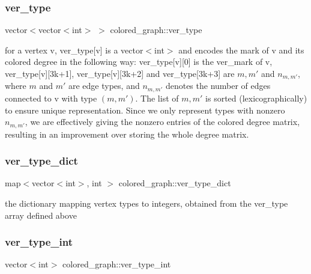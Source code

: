 \subsubsection{\texorpdfstring{ver\+\_\+type}{ver\_type}}
{\footnotesize\ttfamily vector$<$vector$<$int$>$ $>$ colored\+\_\+graph\+::ver\+\_\+type}



for a vertex v, ver\+\_\+type\mbox{[}v\mbox{]} is a vector$<$int$>$ and encodes the mark of v and its colored degree in the following way\+: ver\+\_\+type\mbox{[}v\mbox{]}\mbox{[}0\mbox{]} is the ver\+\_\+mark of v, ver\+\_\+type\mbox{[}v\mbox{]}\mbox{[}3k+1\mbox{]}, ver\+\_\+type\mbox{[}v\mbox{]}\mbox{[}3k+2\mbox{]} and ver\+\_\+type\mbox{[}3k+3\mbox{]} are $m, m'$ and $n_{m, m'}$, where $m$ and $m'$ are edge types, and $n_{m, m'}$ denotes the number of edges connected to v with type $(m, m')$. The list of $m, m'$ is sorted (lexicographically) to ensure unique representation. Since we only represent types with nonzero $n_{m, m'}$, we are effectively giving the nonzero entries of the colored degree matrix, resulting in an improvement over storing the whole degree matrix. 

\mbox{\label{classcolored__graph_aeb780762429ddac375799f4a45405712}} 
\subsubsection{\texorpdfstring{ver\+\_\+type\+\_\+dict}{ver\_type\_dict}}
{\footnotesize\ttfamily map$<$vector$<$int$>$, int $>$ colored\+\_\+graph\+::ver\+\_\+type\+\_\+dict}



the dictionary mapping vertex types to integers, obtained from the ver\+\_\+type array defined above 

\mbox{\label{classcolored__graph_a491ed2ea1a65118af02ec606c8d44c0a}} 
\subsubsection{\texorpdfstring{ver\+\_\+type\+\_\+int}{ver\_type\_int}}
{\footnotesize\ttfamily vector$<$int$>$ colored\+\_\+graph\+::ver\+\_\+type\+\_\+int}




